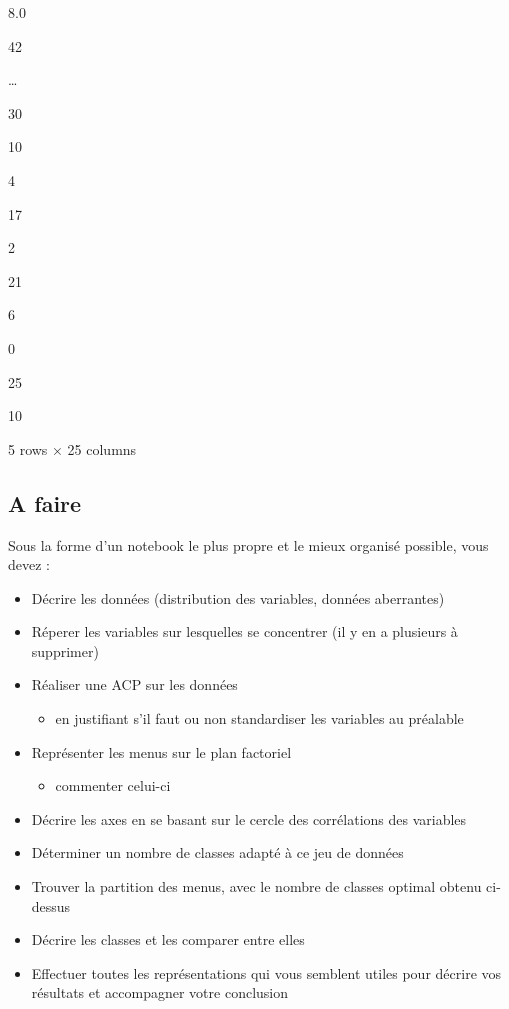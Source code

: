 \documentclass[
]{article}
\providecommand{\tightlist}{%
  \setlength{\itemsep}{0pt}\setlength{\parskip}{0pt}}
\begin{document}
8.0

42

\ldots{}

30

10

4

17

2

21

6

0

25

10

5 rows × 25 columns

\subsection{A faire}\label{a-faire}

Sous la forme d'un notebook le plus propre et le mieux organisé
possible, vous devez :

\begin{itemize}
\tightlist
\item
  Décrire les données (distribution des variables, données aberrantes)
\item
  Réperer les variables sur lesquelles se concentrer (il y en a
  plusieurs à supprimer)
\item
  Réaliser une ACP sur les données

  \begin{itemize}
  \tightlist
  \item
    en justifiant s'il faut ou non standardiser les variables au
    préalable
  \end{itemize}
\item
  Représenter les menus sur le plan factoriel

  \begin{itemize}
  \tightlist
  \item
    commenter celui-ci
  \end{itemize}
\item
  Décrire les axes en se basant sur le cercle des corrélations des
  variables
\item
  Déterminer un nombre de classes adapté à ce jeu de données
\item
  Trouver la partition des menus, avec le nombre de classes optimal
  obtenu ci-dessus
\item
  Décrire les classes et les comparer entre elles
\item
  Effectuer toutes les représentations qui vous semblent utiles pour
  décrire vos résultats et accompagner votre conclusion
\end{itemize}
\end{document}
